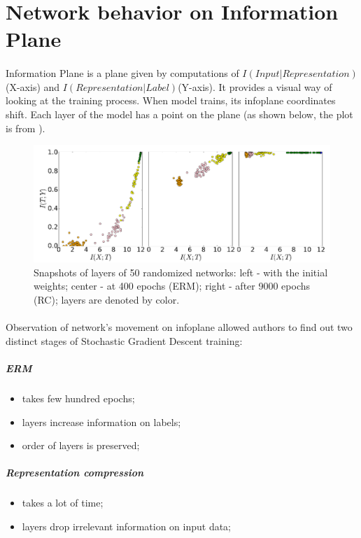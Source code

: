 \documentclass[a4paper,14pt]{extarticle}
\begin{document}
\section{Network behavior on Information Plane}
\paragraph{}
Information Plane is a plane given by computations of $I(Input|Representation)$ (X-axis) and $I(Representation|Label)$(Y-axis). It provides a visual way of looking at the training process. When model trains, its infoplane coordinates shift. Each layer of the model has a point on the plane (as shown below, the plot is from \cite{shwartz2017opening}).
\begin{figure}[!h]
	\label{snapshot}
	\centering
	\includegraphics[width=\textwidth]{../presentation/InformationPlane.png}
	\caption{Snapshots of layers of 50 randomized networks: left - with the initial weights; center - at 400 epochs (ERM); right - after 9000 epochs (RC); layers are denoted by color.}
\end{figure}
\paragraph{}
Observation of network's movement on infoplane allowed authors to find out two distinct stages of Stochastic Gradient Descent training:
\subparagraph{ERM}
\begin{itemize}
	\item takes few hundred epochs;
	\item layers increase information on labels;
	\item order of layers is preserved;
\end{itemize}
\subparagraph{Representation compression}
\begin{itemize}
	\item takes a lot of time;
	\item layers drop irrelevant information on input data;
\end{itemize}
\end{document}
